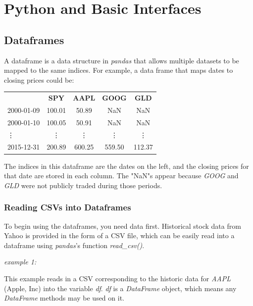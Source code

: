 \chapter{Python and Basic Interfaces}
\section{Dataframes}
\noindent A dataframe is a data structure in \textit{pandas} that
allows multiple datasets to be mapped to the same indices. For
example, a data frame that maps dates to closing prices could be:

\begin{center}
  \begin{tabular}{lcccc}
    & \textbf{SPY} & \textbf{AAPL} & \textbf{GOOG} & \textbf{GLD}\\
    2000-01-09 & 100.01 & 50.89 & NaN & NaN\\
    2000-01-10 & 100.05 & 50.91 & NaN & NaN\\
    \vdots & \vdots & \vdots & \vdots & \vdots \\
    2015-12-31 & 200.89 & 600.25 & 559.50 & 112.37
  \end{tabular}
\end{center}

\noindent The indices in this dataframe are the dates on the left,
and the closing prices for that date are stored in each column. The
"NaN"s appear because \textit{GOOG} and \textit{GLD} were not
publicly traded during those periods.

\subsection{Reading CSVs into Dataframes}
\noindent To begin using the dataframes, you need data first.
Historical stock data from Yahoo is provided in the form of a CSV
file, which can be easily read into a dataframe using
\textit{pandas}'s function \textit{read\_csv()}.\\

\noindent
\begin{minipage}{\linewidth}
  \noindent\textit{example 1:}
  
\end{minipage}

\noindent This example reads in a CSV corresponding to the historic
data for \textit{AAPL} (Apple, Inc) into the variable \textit{df}.
\textit{df} is a \textit{DataFrame} object, which means any
\textit{DataFrame} methods may be used on it.\\

